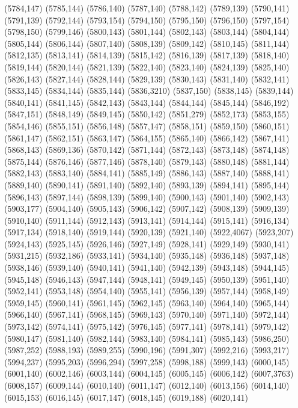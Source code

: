 (5784,147)
(5785,144)
(5786,140)
(5787,140)
(5788,142)
(5789,139)
(5790,141)
(5791,139)
(5792,144)
(5793,154)
(5794,150)
(5795,150)
(5796,150)
(5797,154)
(5798,150)
(5799,146)
(5800,143)
(5801,144)
(5802,143)
(5803,144)
(5804,144)
(5805,144)
(5806,144)
(5807,140)
(5808,139)
(5809,142)
(5810,145)
(5811,144)
(5812,135)
(5813,141)
(5814,139)
(5815,142)
(5816,139)
(5817,139)
(5818,140)
(5819,144)
(5820,144)
(5821,139)
(5822,140)
(5823,140)
(5824,139)
(5825,140)
(5826,143)
(5827,144)
(5828,144)
(5829,139)
(5830,143)
(5831,140)
(5832,141)
(5833,145)
(5834,144)
(5835,144)
(5836,3210)
(5837,150)
(5838,145)
(5839,144)
(5840,141)
(5841,145)
(5842,143)
(5843,144)
(5844,144)
(5845,144)
(5846,192)
(5847,151)
(5848,149)
(5849,145)
(5850,142)
(5851,279)
(5852,173)
(5853,155)
(5854,146)
(5855,151)
(5856,148)
(5857,147)
(5858,151)
(5859,150)
(5860,151)
(5861,147)
(5862,151)
(5863,147)
(5864,155)
(5865,140)
(5866,142)
(5867,141)
(5868,143)
(5869,136)
(5870,142)
(5871,144)
(5872,143)
(5873,148)
(5874,148)
(5875,144)
(5876,146)
(5877,146)
(5878,140)
(5879,143)
(5880,148)
(5881,144)
(5882,143)
(5883,140)
(5884,141)
(5885,149)
(5886,143)
(5887,140)
(5888,141)
(5889,140)
(5890,141)
(5891,140)
(5892,140)
(5893,139)
(5894,141)
(5895,144)
(5896,143)
(5897,144)
(5898,139)
(5899,140)
(5900,143)
(5901,140)
(5902,143)
(5903,177)
(5904,140)
(5905,143)
(5906,142)
(5907,142)
(5908,139)
(5909,139)
(5910,140)
(5911,144)
(5912,143)
(5913,141)
(5914,144)
(5915,141)
(5916,134)
(5917,134)
(5918,140)
(5919,144)
(5920,139)
(5921,140)
(5922,4067)
(5923,207)
(5924,143)
(5925,145)
(5926,146)
(5927,149)
(5928,141)
(5929,149)
(5930,141)
(5931,215)
(5932,186)
(5933,141)
(5934,140)
(5935,148)
(5936,148)
(5937,148)
(5938,146)
(5939,140)
(5940,141)
(5941,140)
(5942,139)
(5943,148)
(5944,145)
(5945,148)
(5946,143)
(5947,144)
(5948,141)
(5949,145)
(5950,139)
(5951,140)
(5952,141)
(5953,148)
(5954,140)
(5955,141)
(5956,139)
(5957,144)
(5958,149)
(5959,145)
(5960,141)
(5961,145)
(5962,145)
(5963,140)
(5964,140)
(5965,144)
(5966,140)
(5967,141)
(5968,145)
(5969,143)
(5970,140)
(5971,140)
(5972,144)
(5973,142)
(5974,141)
(5975,142)
(5976,145)
(5977,141)
(5978,141)
(5979,142)
(5980,147)
(5981,140)
(5982,144)
(5983,140)
(5984,141)
(5985,143)
(5986,250)
(5987,252)
(5988,193)
(5989,255)
(5990,196)
(5991,307)
(5992,216)
(5993,217)
(5994,237)
(5995,203)
(5996,294)
(5997,258)
(5998,188)
(5999,143)
(6000,145)
(6001,140)
(6002,146)
(6003,144)
(6004,145)
(6005,145)
(6006,142)
(6007,3763)
(6008,157)
(6009,144)
(6010,140)
(6011,147)
(6012,140)
(6013,156)
(6014,140)
(6015,153)
(6016,145)
(6017,147)
(6018,145)
(6019,188)
(6020,141)
